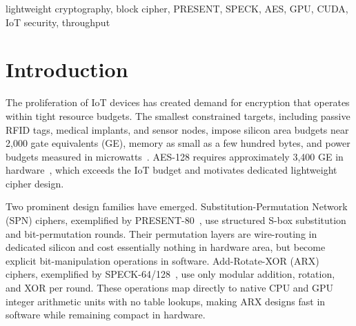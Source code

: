 \documentclass[conference]{IEEEtran}
\begin{document}
\begin{abstract}
Lightweight block ciphers are designed to fit within the stringent silicon area budgets of constrained
IoT hardware where standards like AES-128 are too heavy. However, the software and GPU throughput
characteristics of these architectural families are rarely compared against AES on a single, controlled
platform. This paper presents from-scratch C++ and CUDA implementations of PRESENT-80, SPECK-64/128,
and AES-128, validated against official test vectors and benchmarked on an AMD EPYC CPU and an NVIDIA
L40S GPU. Our evaluation shows that the Add-Rotate-XOR (ARX) design of SPECK achieves massive
performance advantages, leading CPU and GPU encryption throughput at 1,133~MB/s and 356~GB/s,
respectively, while minimizing key-schedule latency and device memory footprint. Conversely, the
Substitution-Permutation Network (SPN) design of PRESENT-80 yields the lowest absolute throughput but
achieves the highest relative GPU speedup (over 5,200$\times$) by mitigating severe CPU-side
bit-manipulation inefficiencies. Furthermore, we identify a 37\% performance drop specific to AES-128
in Counter (CTR) mode on the GPU, driven by per-thread register pressure inherent to its
table-intensive structure. These insights demonstrate that ARX ciphers uniquely align hardware area
constraints with software and parallel processing scalability, providing critical design guidance for
secure IoT ecosystems.
\end{abstract}

\begin{IEEEkeywords}
lightweight cryptography, block cipher, PRESENT, SPECK, AES, GPU, CUDA, IoT security, throughput
\end{IEEEkeywords}

\section{Introduction}

The proliferation of IoT devices has created demand for encryption that operates within tight resource
budgets. The smallest constrained targets, including passive RFID tags, medical implants, and sensor
nodes, impose silicon area budgets near 2,000 gate equivalents (GE), memory as small as a few hundred
bytes, and power budgets measured in microwatts~\cite{survey}. AES-128 requires approximately 3,400 GE
in hardware~\cite{fips197}, which exceeds the IoT budget and motivates dedicated lightweight cipher
design.

Two prominent design families have emerged. Substitution-Permutation Network (SPN) ciphers, exemplified
by PRESENT-80~\cite{present}, use structured S-box substitution and bit-permutation rounds. Their
permutation layers are wire-routing in dedicated silicon and cost essentially nothing in hardware area,
but become explicit bit-manipulation operations in software. Add-Rotate-XOR (ARX) ciphers, exemplified
by SPECK-64/128~\cite{speck}, use only modular addition, rotation, and XOR per round. These operations
map directly to native CPU and GPU integer arithmetic units with no table lookups, making ARX designs
fast in software while remaining compact in hardware.
\end{document}
